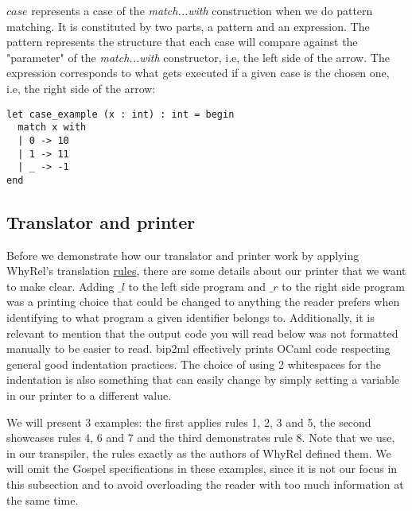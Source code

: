$case$ represents a case of the \emph{match...with} construction when we do pattern matching.
It is constituted by two parts, a pattern and an expression.
The pattern represents the structure that each case will compare against the "parameter" of the \emph{match...with} constructor, i.e, the left side of the arrow.
The expression corresponds to what gets executed if a given case is the chosen one, i.e, the right side of the arrow:

\begin{lstlisting}[mathescape, basicstyle=\ttfamily, columns=flexible,
                    emph={type, and, let, rec, if, then, else, mod, in, for, while, do, done, to, begin, end, assert, match, with, of, open, include,ref},
                    emphstyle=\ttfamily\bfseries\color{myorange}]
let case_example (x : int) : int = begin
  match x with
  | 0 -> 10
  | 1 -> 11
  | _ -> -1 
end
\end{lstlisting}


\FloatBarrier
\subsection{Translator and printer}
\label{subsec:translator_printer}

Before we demonstrate how our translator and printer work by applying WhyRel's translation \hyperref[fig:translation-biprograms-rules]{rules}, there are some details about our printer that we want to make clear.
Adding $\_l$ to the left side program and $\_r$ to the right side program was a printing choice that could be changed to anything the reader prefers when identifying to what program a given identifier belongs to.
Additionally, it is relevant to mention that the output code you will read below was not formatted manually to be easier to read.
bip2ml effectively prints OCaml code respecting general good indentation practices.
The choice of using 2 whitespaces for the indentation is also something that can easily change by simply setting a variable in our printer to a different value.

We will present 3 examples: the first applies rules 1, 2, 3 and 5, the second showcases rules 4, 6 and 7 and the third demonstrates rule 8.
Note that we use, in our transpiler, the rules exactly as the authors of WhyRel defined them. 
We will omit the Gospel specifications in these examples, since it is not our focus in this subsection and to avoid overloading the reader with too much information at the same time.

